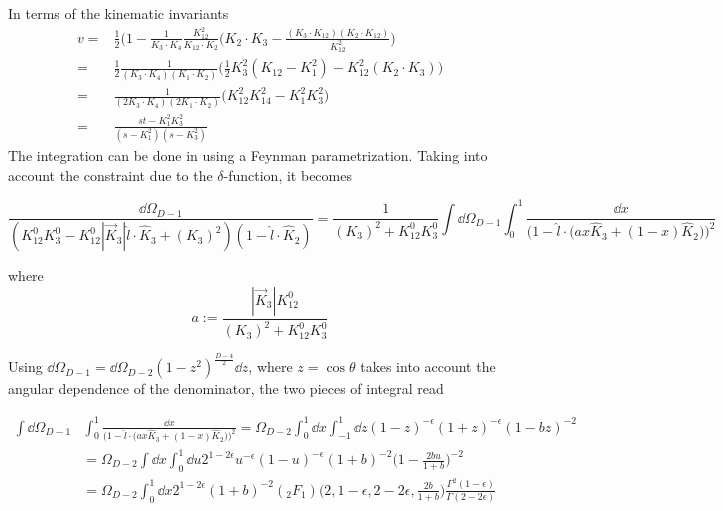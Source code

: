 In terms of the kinematic invariants
\begin{equation*}
\begin{split}
v= &
\frac{1}{2}\Big( 1 - \frac{1}{K_3\cdot K_4}\frac{K_{12}^2}{K_{12}\cdot K_2}\big(K_2\cdot K_3 - \frac{(K_3\cdot K_{12})(K_2\cdot K_{12})}{K_{12}^2} \Big)
\\
= &
\frac{1}{2}\frac{1}{(K_3\cdot K_4)(K_1\cdot K_2)}
\Big( \frac{1}{2}K_3^2 (K_{12}- K_1^2) - K_{12}^2(K_2\cdot K_3)
\Big)
\\
=&
\frac{1}{(2K_3\cdot K_4)(2K_1\cdot K_2)}\big(K_{12}^2K_{14}^2 - K_1^2K_3^2\big)
\\
= &
\frac{st - K_1^2K_3^2}{(s-K_1^2)(s-K_3^2)}
\end{split}
\end{equation*}
%
%
%
\color{gray}
The integration can be done in using a Feynman parametrization.
Taking into account the constraint due to the $\delta$-function, 
it becomes

\begin{equation*}
\frac{\dd \Omega_{D-1}}{(K_{12}^0 K_3^0 - K_{12}^0 |\vec{K}_3| \hat{l}\cdot \hat{K}_3 + (K_3)^2)(1-\hat{l}\cdot\hat{K}_2)}
= \frac{1}{(K_3)^2 + K_{12}^0 K_3^0}\int \dd \Omega_{D-1}\int_0^1\frac{\dd x}{\Big(1-\hat{l}\cdot\big(ax \hat{K}_3 + (1-x)\hat{K}_2\big)\Big)^2}
\end{equation*}

where 
\begin{equation*}
a := \frac{|\vec{K}_3|K_{12}^0}{(K_3)^2 + K_{12}^0 K_3^0}
\end{equation*}

Using $\dd\Omega_{D-1} = \dd \Omega_{D-2}(1-z^2)^{\frac{D-4}{2}}\dd z$, where $z = \cos\theta$ takes into account the angular dependence of the denominator, the two pieces of integral read

\begin{equation*}
\begin{split}
\int \dd \Omega_{D-1} &
\int_0^1\frac{\dd x}{\Big(1-\hat{l}\cdot\big(ax \hat{K}_3 + (1-x)\hat{K}_2\big)\Big)^2}
= \Omega_{D-2}\int_0^1\dd x \int_{-1}^1 \dd z (1-z)^{-\epsilon}(1+z)^{-\epsilon} (1-bz)^{-2}
\\
& = 
\Omega_{D-2}\int\dd x \int^1_0\dd u 2^{1-2\epsilon} u^{-\epsilon}(1-u)^{-\epsilon}(1+b)^{-2}\big(1-\frac{2bu}{1+b}\big)^{-2}
\\
& = 
\Omega_{D-2}\int^1_0 \dd x 2^{1-2\epsilon}(1+b)^{-2} (_2F_1)\big(2,1-\epsilon, 2-2\epsilon, \frac{2b}{1+b}\big)
\frac{\Gamma^2(1-\epsilon)}{\Gamma(2-2\epsilon)} 
\end{split}
\end{equation*}

